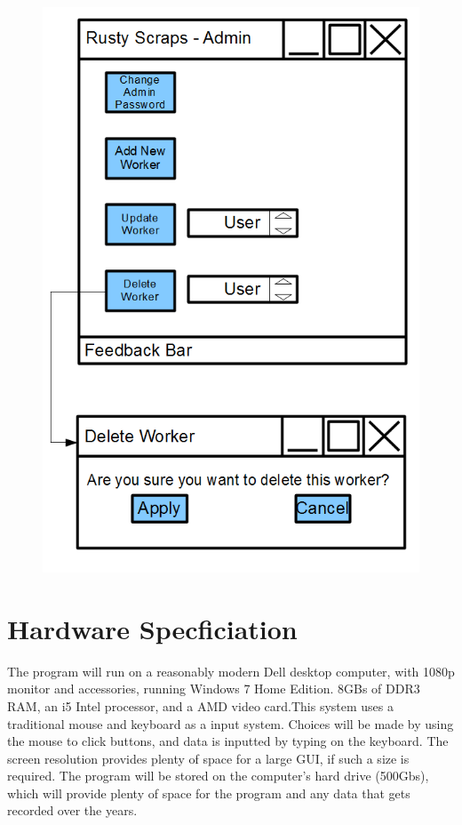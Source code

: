 \begin{figure}[H]
    \includegraphics[width=\textwidth]{./Design/Images/DeleteWorker.png}
\end{figure}


\section{Hardware Specficiation}

The program will run on a reasonably modern Dell desktop computer, with 1080p monitor and accessories, running Windows 7 Home Edition. 8GBs of DDR3 RAM, an i5 Intel processor, and a AMD video card.This system uses a traditional mouse and keyboard as a input system. Choices will be made by using the mouse to click buttons, and data is inputted by typing on the keyboard. The screen resolution provides plenty of space for a large GUI, if such a size is required. The program will be stored on the computer's hard drive (500Gbs), which will provide plenty of space for the program and any data that gets recorded over the years.


